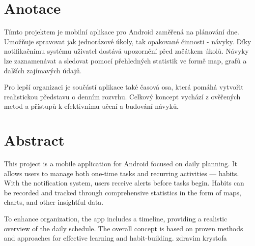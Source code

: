 \thispagestyle{empty} %

\section*{Anotace} 
\hspace{14pt} Tímto projektem je mobilní aplikace pro Android zaměřená na plánování dne. Umožňuje spravovat jak jednorázové úkoly, tak opakované činnosti - návyky. Díky notifikačnímu systému uživatel dostává upozornění před začátkem úkolů. Návyky lze zaznamenávat a sledovat pomocí přehledných statistik ve formě map, grafů a dalších zajímavých údajů.

Pro lepší organizaci je součástí aplikace také časová osa, která pomáhá vytvořit realistickou představu o denním rozvrhu. Celkový koncept vychází z ověřených metod a přístupů k efektivnímu učení a budování návyků.

\section*{Abstract} 
\hspace{14pt} This project is a mobile application for Android focused on daily planning. It allows users to manage both one-time tasks and recurring activities — habits. With the notification system, users receive alerts before tasks begin. Habits can be recorded and tracked through comprehensive statistics in the form of maps, charts, and other insightful data.  

To enhance organization, the app includes a timeline, providing a realistic overview of the daily schedule. The overall concept is based on proven methods and approaches for effective learning and habit-building. zdravim krystofa